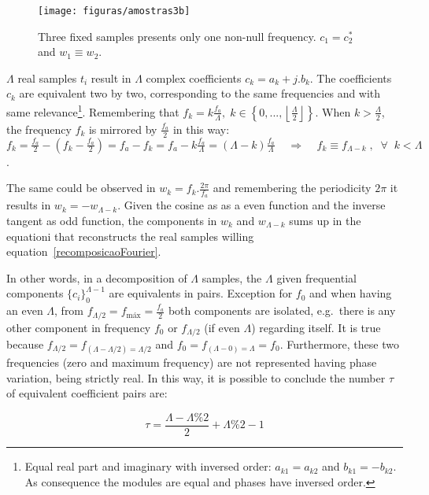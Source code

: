 \documentclass[
 aip,
 jmp,
 amsmath,amssymb,
 reprint,
]{revtex4-1}
\begin{document}
 \begin{figure}[h!]
     \centering
         \texttt{[image: figuras/amostras3b]}
     \caption{Three fixed samples presents only one non-null frequency. $c_1=c_2^*$ and $w_1 \equiv w_2$.}
         \label{fig:amostras3}
 \end{figure}

$\Lambda$ real samples $t_i$ result in $\Lambda$ complex coefficients $c_k=a_k+j.b_k$. The coefficients $c_k$ are equivalent two by two, corresponding to the same frequencies and with same relevance\footnote{Equal real part and imaginary with inversed order: $a_{k1}=a_{k2}$ and $b_{k1}=-b_{k2}$. As consequence the modules are equal and phases have inversed order.}. Remembering that $f_k = k\frac{f_a}{\Lambda}, \; k \in \left\{0, ..., \left \lfloor \frac{\Lambda}{2} \right \rfloor \right\} $. When $k > \frac{\Lambda}{2}$, the frequency $f_k$ is mirrored by $\frac{f_a}{2}$ in this way: $f_k=\frac{f_a}{2} - (f_k-\frac{f_a}{2})=f_a-f_k=f_a - k\frac{f_a}{\Lambda}=(\Lambda-k)\frac{f_a}{\Lambda} \;\;\;\; \Rightarrow \;\;\;\; f_k\equiv f_{\Lambda-k} \; ,\;\; \forall \;\; k<\Lambda$. 

The same could be observed in $w_k=f_k.\frac{2\pi}{f_a}$ and remembering the periodicity $2\pi$ it results in $w_k=-w_{\Lambda-k}$. Given the cosine as as a even function and the inverse tangent as odd function, the components in $w_k$ and $w_{\Lambda-k}$ sums up in the equationi that reconstructs the real samples willing equation~\ref{recomposicaoFourier}.


In other words, in a decomposition of $\Lambda$ samples, the $\Lambda$ given frequential components $\{c_i\}_0^{\Lambda-1}$ are equivalents in pairs.
Exception for $f_0$ and when having an even $\Lambda$, from $f_{\Lambda/2}=f_{\text{máx}}=\frac{f_a}{2}$ both components are isolated, e.g.\ there is any other component in frequency $f_0$ or $f_{\Lambda/2}$ (if even $\Lambda$) regarding itself. 
It is true because $f_{\Lambda/2}=f_{(\Lambda-\Lambda/2) = \Lambda/2}$ and $f_0=f_{(\Lambda-0)=\Lambda}=f_0$.
Furthermore, these two frequencies (zero and maximum frequency) are not represented having phase variation, being strictly real. In this way, it is possible to conclude the number $\tau$ of equivalent coefficient pairs are:

\begin{equation}\label{coefsPareados}
\tau = \frac{\Lambda - \Lambda \% 2}{2} +\Lambda \% 2 -1
\end{equation}
\end{document}

